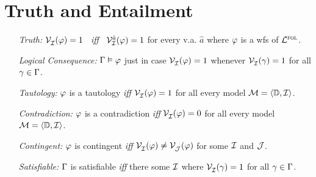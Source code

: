 \documentclass[a4paper, 11pt]{article} %
\begin{document}
\section*{Truth and Entailment}

\begin{enumerate}
  \item[\it Truth:] $\mathcal{V}_{\mathcal{I}}^{}(\varphi)=1$ ~\textit{iff}~ $\mathcal{V}_{\mathcal{I}}^{\hat{a}}(\varphi)=1$ for every v.a. $\hat{a}$ where $\varphi$ is a wfs of $\mathcal{L}^{\textsc{fol}}$. 
  \item[\it Logical Consequence:] $\Gamma\vDash\varphi$ just in case $\mathcal{V}_{\mathcal{I}}^{}(\varphi) = 1$ whenever $\mathcal{V}_{\mathcal{I}}^{}(\gamma) = 1$ for all $\gamma \in \Gamma$.
  \item[\it Tautology:] $\varphi$ is a tautology \textit{iff} $\mathcal{V}_{\mathcal{I}}^{}(\varphi) = 1$ for all every model $\mathcal{M} = \langle\mathbb{D}, \mathcal{I}\rangle$.
  \item[\it Contradiction:] $\varphi$ is a contradiction \textit{iff} $\mathcal{V}_{\mathcal{I}}^{}(\varphi) = 0$ for all every model $\mathcal{M} = \langle\mathbb{D}, \mathcal{I}\rangle$.
  \item[\it Contingent:] $\varphi$ is contingent \textit{iff} $\mathcal{V}_{\mathcal{I}}^{}(\varphi) \neq \mathcal{V}_{\mathcal{J}}^{}(\varphi)$ for some $\mathcal{I}$ and $\mathcal{J}$.
  \item[\it Satisfiable:] $\Gamma$ is satisfiable \textit{iff} there some $\mathcal{I}$ where $\mathcal{V}_{\mathcal{I}}^{}(\gamma) = 1$ for all $\gamma \in \Gamma$.
\end{enumerate}
\end{document}

